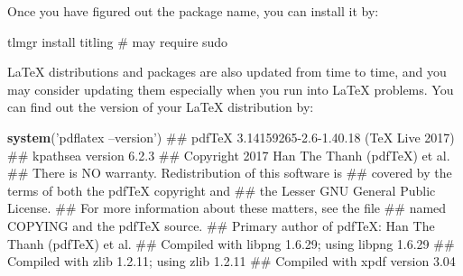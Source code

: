 \documentclass[12pt,]{krantz}
\makeatletter
\newenvironment{Shaded}{\begin{snugshade}}{\end{snugshade}}
\newcommand{\KeywordTok}[1]{\textcolor[rgb]{0.13,0.29,0.53}{\textbf{#1}}}
\newcommand{\StringTok}[1]{\textcolor[rgb]{0.31,0.60,0.02}{#1}}
\newcommand{\ExtensionTok}[1]{#1}
\newcommand{\NormalTok}[1]{#1}
\newenvironment{kframe}{%
\medskip{}
\setlength{\fboxsep}{.8em}
 \def\at@end@of@kframe{}%
 \ifinner\ifhmode%
  \def\at@end@of@kframe{\end{minipage}}%
  \begin{minipage}{\columnwidth}%
 \fi\fi%
 \def\FrameCommand##1{\hskip\@totalleftmargin \hskip-\fboxsep
 \colorbox{shadecolor}{##1}\hskip-\fboxsep
     \hskip-\linewidth \hskip-\@totalleftmargin \hskip\columnwidth}%
 \MakeFramed {\advance\hsize-\width
   \@totalleftmargin\z@ \linewidth\hsize
   \@setminipage}}%
 {\par\unskip\endMakeFramed%
 \at@end@of@kframe}
\renewenvironment{Shaded}{\begin{kframe}}{\end{kframe}}
\theoremstyle{definition}
\theoremstyle{definition}
\theoremstyle{definition}
\theoremstyle{remark}
\makeatother
\begin{document}
Once you have figured out the package name, you can install it by:

\begin{Shaded}
\begin{Highlighting}[]
\ExtensionTok{tlmgr}\NormalTok{ install titling  # may require sudo}
\end{Highlighting}
\end{Shaded}

LaTeX distributions and packages are also updated from time to time, and
you may consider updating them especially when you run into LaTeX
problems. You can find out the version of your LaTeX distribution by:

\begin{Shaded}
\begin{Highlighting}[]
\KeywordTok{system}\NormalTok{(}\StringTok{'pdflatex --version'}\NormalTok{)}
\NormalTok{## pdfTeX 3.14159265-2.6-1.40.18 (TeX Live 2017)}
\NormalTok{## kpathsea version 6.2.3}
\NormalTok{## Copyright 2017 Han The Thanh (pdfTeX) et al.}
\NormalTok{## There is NO warranty.  Redistribution of this software is}
\NormalTok{## covered by the terms of both the pdfTeX copyright and}
\NormalTok{## the Lesser GNU General Public License.}
\NormalTok{## For more information about these matters, see the file}
\NormalTok{## named COPYING and the pdfTeX source.}
\NormalTok{## Primary author of pdfTeX: Han The Thanh (pdfTeX) et al.}
\NormalTok{## Compiled with libpng 1.6.29; using libpng 1.6.29}
\NormalTok{## Compiled with zlib 1.2.11; using zlib 1.2.11}
\NormalTok{## Compiled with xpdf version 3.04}
\end{Highlighting}
\end{Shaded}



\backmatter
\printindex
\end{document}
